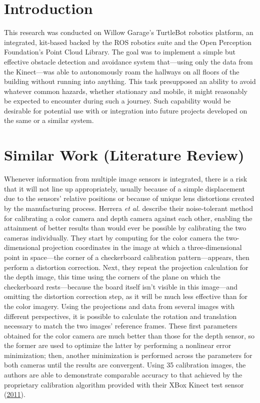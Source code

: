 \documentclass[12pt]{report}
\begin{document}
\setcounter{page}{3}
\tableofcontents
\clearpage
{}
{}
\listoffigures
\clearpage
{}
{}
\listoftables
\newpage

\section{Introduction}
This research was conducted on Willow Garage's TurtleBot robotics platform, an integrated, kit-based backed by the ROS robotics suite and the Open Perception Foundation's Point Cloud Library.  The goal was to implement a simple but effective obstacle detection and avoidance system that---using only the data from the Kinect---was able to autonomously roam the hallways on all floors of the building without running into anything.  This task presupposed an ability to avoid whatever common hazards, whether stationary and mobile, it might reasonably be expected to encounter during such a journey.  Such capability would be desirable for potential use with or integration into future projects developed on the same or a similar system.

\section{Similar Work (Literature Review)}
Whenever information from multiple image sensors is integrated, there is a risk that it will not line up appropriately, usually because of a simple displacement due to the sensors' relative positions or because of unique lens distortions created by the manufacturing process.  Herrera \textit{et al.} describe their noise-tolerant method for calibrating a color camera and depth camera against each other, enabling the attainment of better results than would ever be possible by calibrating the two cameras individually.  They start by computing for the color camera the two-dimensional projection coordinates in the image at which a three-dimensional point in space---the corner of a checkerboard calibration pattern---appears, then perform a distortion correction.  Next, they repeat the projection calculation for the depth image, this time using the corners of the plane on which the checkerboard rests---because the board itself isn't visible in this image---and omitting the distortion correction step, as it will be much less effective than for the color imagery.  Using the projections and data from several images with different perspectives, it is possible to calculate the rotation and translation necessary to match the two images' reference frames.  These first parameters obtained for the color camera are much better than those for the depth sensor, so the former are used to optimize the latter by performing a nonlinear error minimization; then, another minimization is performed across the parameters for both cameras until the results are convergent.  Using 35 calibration images, the authors are able to demonstrate comparable accuracy to that achieved by the proprietary calibration algorithm provided with their XBox Kinect test sensor (\hyperref[bib:herrera]{2011}).
\end{document}
